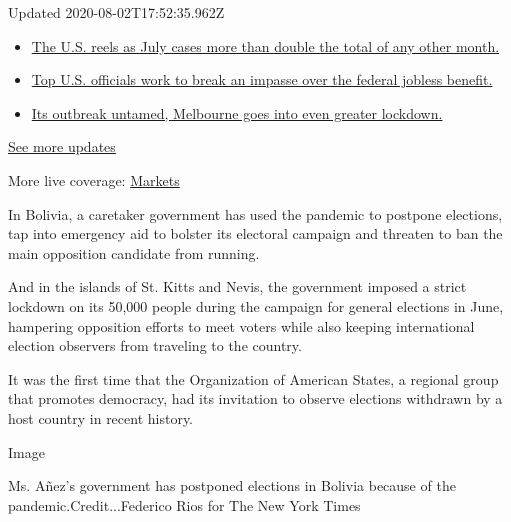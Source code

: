 Updated 2020-08-02T17:52:35.962Z

\begin{itemize}
\tightlist
\item
  \href{https://www.nytimes3xbfgragh.onion/2020/08/01/world/coronavirus-covid-19.html?action=click\&pgtype=Article\&state=default\&region=MAIN_CONTENT_1\&context=storylines_live_updates\#link-34047410}{The
  U.S. reels as July cases more than double the total of any other
  month.}
\item
  \href{https://www.nytimes3xbfgragh.onion/2020/08/01/world/coronavirus-covid-19.html?action=click\&pgtype=Article\&state=default\&region=MAIN_CONTENT_1\&context=storylines_live_updates\#link-780ec966}{Top
  U.S. officials work to break an impasse over the federal jobless
  benefit.}
\item
  \href{https://www.nytimes3xbfgragh.onion/2020/08/01/world/coronavirus-covid-19.html?action=click\&pgtype=Article\&state=default\&region=MAIN_CONTENT_1\&context=storylines_live_updates\#link-2bc8948}{Its
  outbreak untamed, Melbourne goes into even greater lockdown.}
\end{itemize}

\href{https://www.nytimes3xbfgragh.onion/2020/08/01/world/coronavirus-covid-19.html?action=click\&pgtype=Article\&state=default\&region=MAIN_CONTENT_1\&context=storylines_live_updates}{See
more updates}

More live coverage:
\href{https://www.nytimes3xbfgragh.onion/live/2020/07/31/business/stock-market-today-coronavirus?action=click\&pgtype=Article\&state=default\&region=MAIN_CONTENT_1\&context=storylines_live_updates}{Markets}

In Bolivia, a caretaker government has used the pandemic to postpone
elections, tap into emergency aid to bolster its electoral campaign and
threaten to ban the main opposition candidate from running.

And in the islands of St. Kitts and Nevis, the government imposed a
strict lockdown on its 50,000 people during the campaign for general
elections in June, hampering opposition efforts to meet voters while
also keeping international election observers from traveling to the
country.

It was the first time that the Organization of American States, a
regional group that promotes democracy, had its invitation to observe
elections withdrawn by a host country in recent history.

Image

Ms. Añez's government has postponed elections in Bolivia because of the
pandemic.Credit...Federico Rios for The New York Times

